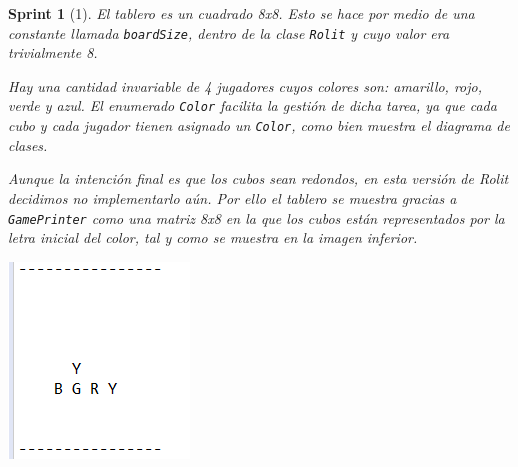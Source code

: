 \documentclass[12pt,a4paper,openright]{book}
\theoremstyle{break}
\newtheorem*{sprint}{Sprint}
\begin{document}
\begin{sprint}[1]
El tablero es un cuadrado 8x8. Esto se hace por medio de una constante llamada \texttt{boardSize}, dentro de la clase \texttt{Rolit} y cuyo valor era trivialmente 8. 

Hay una cantidad invariable de 4 jugadores cuyos colores son: amarillo, rojo, verde y azul. El enumerado \texttt{Color} facilita la gestión de dicha tarea, ya que cada cubo y cada jugador tienen asignado un \texttt{Color}, como bien muestra el diagrama de clases. 

Aunque la intención final es que los cubos sean redondos, en esta versión de Rolit decidimos no implementarlo aún. Por ello el tablero se muestra gracias a \texttt{GamePrinter} como una matriz 8x8 en la que los cubos están representados por la letra inicial del color, tal y como se muestra en la imagen inferior.
\begin{center}
\includegraphics[scale=0.8]{Board.png}
\end{center}


\end{sprint}
\end{document}
